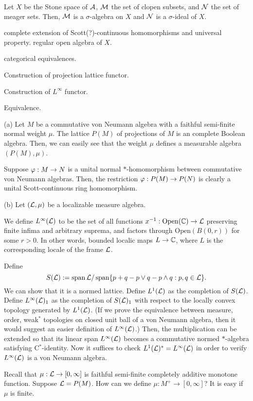 \documentclass{../../large}
\begin{document}
Let $X$ be the Stone space of $\mathcal{A}$, $\mathcal{M}$ the set of clopen subsets, and $\mathcal{N}$ the set of meager sets.
Then, $\mathcal{M}$ is a $\sigma$-algebra on $X$ and $\mathcal{N}$ is a $\sigma$-ideal of $X$.

complete extension of Scott(?)-continuous homomorphisms and universal property.
regular open algebra of $X$.










\begin{prb}
categorical equivalences.
\begin{parts}
\item Construction of projection lattice functor.
\item Construction of $L^\infty$ functor.
\item Equivalence.
\end{parts}
\end{prb}
\begin{pf}
(a)
Let $M$ be a commutative von Neumann algebra with a faithful semi-finite normal weight $\mu$.
The lattice $P(M)$ of projections of $M$ is an complete Boolean algebra.
Then, we can easily see that the weight $\mu$ defines a measurable algebra $(P(M),\mu)$.

Suppose $\varphi:M\to N$ is a unital normal $*$-homomorphism between commutative von Neumann algebras.
Then, the restriction $\varphi:P(M)\to P(N)$ is clearly a unital Scott-continuous ring homomorphism.


(b)
Let $(\mathcal{L},\mu)$ be a localizable measure algebra.

We define $L^\infty(\mathcal{L})$ to be the set of all functions $x^{-1}:\mathrm{Open}(\mathbb{C})\to\mathcal{L}$ preserving finite infima and arbitrary suprema, and factors through $\mathrm{Open}(B(0,r))$ for some $r>0$.
In other words, bounded localic maps $L\to\mathbb{C}$, where $L$ is the corresponding locale of the frame $\mathcal{L}$.


Define
\[S(\mathcal{L}):=\operatorname{span}\mathcal{L}/\operatorname{span}\{p+q-p\vee q-p\wedge q:p,q\in\mathcal{L}\}.\]
We can show that it is a normed lattice.
Define $L^1(\mathcal{L})$ as the completion of $S(\mathcal{L})$.
Define $L^\infty(\mathcal{L})_1$ as the completion of $S(\mathcal{L})_1$ with respect to the locally convex topology generated by $L^1(\mathcal{L})$.
(If we prove the equivalence between measure, order, weak$^*$ topologies on closed unit ball of a von Neumann algebra, then it would suggest an easier definition of $L^\infty(\mathcal{L})$.)
Then, the multiplication can be extended so that its linear span $L^\infty(\mathcal{L})$ becomes a commutative normed $*$-algebra satisfying C$^*$-identity.
Now it suffices to check $L^1(\mathcal{L})^*=L^\infty(\mathcal{L})$ in order to verify $L^\infty(\mathcal{L})$ is a von Neumann algebra.




Recall that $\mu:\mathcal{L}\to[0,\infty]$ is faithful semi-finite completely additive monotone function.
Suppose $\mathcal{L}=P(M)$.
How can we define $\mu:M^+\to[0,\infty]$?
It is easy if $\mu$ is finite.


\end{pf}
\end{document}
